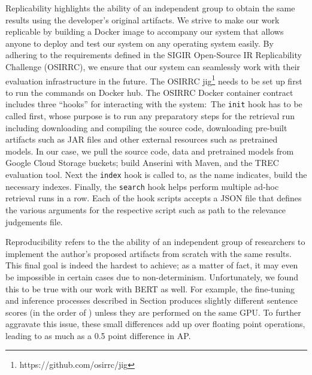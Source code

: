 Replicability highlights the ability of an independent group to obtain the same results using the developer's original artifacts.
We strive to make our work replicable by building a Docker image to accompany our system that allows anyone to deploy and test our system on any operating system easily.
By adhering to the requirements defined in the SIGIR Open-Source IR Replicability Challenge (OSIRRC), we ensure that our system can seamlessly work with their evaluation infrastructure in the future.
The OSIRRC jig\footnote{https://github.com/osirrc/jig} needs to be set up first to run the commands on Docker hub.
The OSIRRC Docker container contract includes three ``hooks'' for interacting with the system:\
The \texttt{init} hook has to be called first, whose purpose is to run any preparatory steps for the retrieval run including downloading and compiling the source code, downloading pre-built artifacts such as JAR files and other external resources such as pretrained models.
In our case, we pull the source code, data and pretrained models from Google Cloud Storage buckets; build Anserini with Maven, and the TREC evaluation tool.
Next the \texttt{index} hook is called to, as the name indicates, build the necessary indexes.
Finally, the \texttt{search} hook helps perform multiple ad-hoc retrieval runs in a row.
Each of the hook scripts accepts a JSON file that defines the various arguments for the respective script such as path to the relevance judgements file.

Reproducibility refers to the the ability of an independent group of researchers to implement the author's proposed artifacts from scratch with the same results.
This final goal is indeed the hardest to achieve; as a matter of fact, it may even be impossible in certain cases due to non-determinism.
Unfortunately, we found this to be true with our work with BERT as well.
For example, the fine-tuning and inference processes described in Section  produces slightly different sentence scores (in the order of ) unless they are performed on the same GPU.
To further aggravate this issue, these small differences add up over floating point operations, leading to as much as a 0.5 point difference in AP.
\myworries{Score ties, hyperparameters?}



